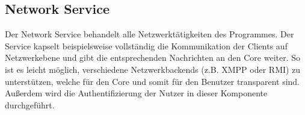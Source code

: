 \subsection{Network Service} %
Der Network Service behandelt alle Netzwerktätigkeiten des Programmes. Der Service kapselt beispielsweise
vollständig die Kommunikation der Clients auf Netzwerkebene und gibt die entsprechenden Nachrichten an
den Core weiter. So ist es leicht möglich, verschiedene Netzwerkbackends (z.B. XMPP oder RMI) zu unterstützen,
welche für den Core und somit für den Benutzer transparent sind. Außerdem wird die Authentifizierung der
Nutzer in dieser Komponente durchgeführt.


